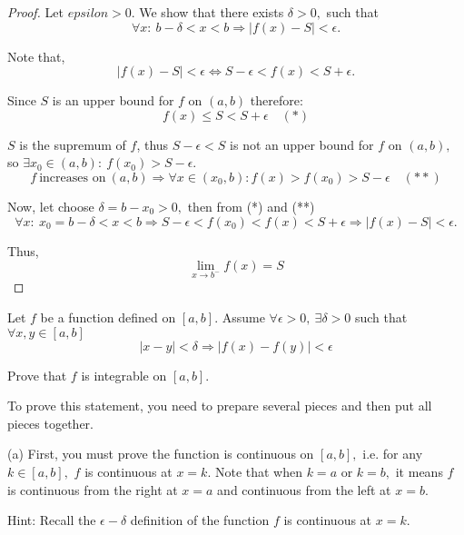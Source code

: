 \documentclass{article}
\begin{document}
\begin{proof}
    Let $epsilon > 0.$ We show that there exists $\delta > 0,$ such that
    \[
        \forall x:\ b-\delta < x < b \Rightarrow|f(x) - S| < \epsilon.
    \]

    Note that,
    \[
        |f(x) - S| < \epsilon \Leftrightarrow S - \epsilon < f(x) < S + \epsilon.
    \]

    Since $S$ is an upper bound for $f$ on $(a, b)$ therefore:
    \[
        f(x) \le S < S + \epsilon \quad (*)
    \]

    $S$ is the supremum of $f$, thus $S - \epsilon < S$ is not an upper bound for $f$ on $(a, b),$ so $\exists x_0 \in (a, b):\ f(x_0) > S - \epsilon.$
    \[
        f\ \text{increases on}\ (a, b) \Rightarrow \forall x \in (x_0, b): f(x) > f(x_0) > S-\epsilon \quad (**)
    \]

    Now, let choose $\delta = b - x_0 > 0,$ then from (*) and (**)
    \[
        \forall x:\ x_0 = b-\delta < x < b \Rightarrow S-\epsilon < f(x_0) < f(x) < S + \epsilon \Rightarrow|f(x) - S| < \epsilon.
    \]

    Thus,
    \[
        \lim_{x \rightarrow b^{-}} f(x) = S
    \]
\end{proof}

\newpage

\begin{problem*}[3a]
    Let $f$ be a function defined on $[a, b].$ Assume $\forall \epsilon > 0,\ \exists \delta > 0$ such that $\forall x, y \in [a,b]$
    \[
        |x-y| < \delta \Rightarrow |f(x) - f(y)| < \epsilon
    \]
    
    Prove that $f$ is integrable on $[a,b].$
    
    To prove this statement, you need to prepare several pieces and then put all pieces together.

    (a) First, you must prove the function is continuous on $[a, b],$ i.e. for any $k \in [a, b],$ $f$ is continuous at $x=k.$
    Note that when $k=a$ or $k=b,$ it means $f$ is continuous from the right at $x=a$ and continuous from the left at $x = b.$

    Hint: Recall the $\epsilon-\delta$ definition of the function $f$ is continuous at $x = k.$
\end{problem*}
\end{document}
